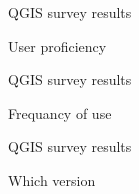 \begin{frame}{QGIS survey results}
	\begin{block}{User proficiency}
	\end{block}
\end{frame}

\begin{frame}{QGIS survey results}
	\begin{block}{Frequancy of use}
	\end{block}
\end{frame}

\begin{frame}{QGIS survey results}
	\begin{block}{Which version}
	\end{block}
\end{frame}

